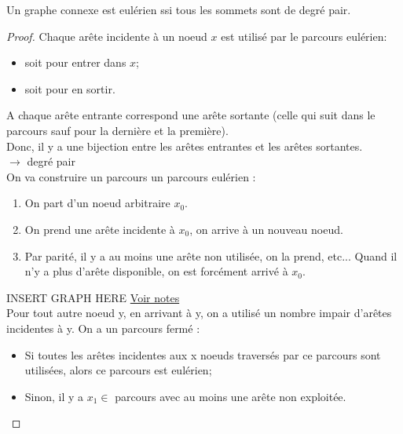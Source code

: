 \begin{mytheo} 
  Un graphe connexe est eulérien ssi tous les sommets sont de degré pair.
  \begin{proof}
    \noindent
    \newline
    \fbox{$\Longrightarrow$}
    \newline
    Chaque arête incidente à un noeud $x$ est utilisé par le parcours eulérien:
    \begin{itemize}
      \item soit pour entrer dans $x$;
      \item soit pour en sortir.\\
    \end{itemize}
    A chaque arête entrante correspond une arête sortante (celle qui suit dans le parcours sauf pour la dernière et la première).\\
    Donc, il y a une bijection entre les arêtes entrantes et les arêtes sortantes.\\
    $\longrightarrow$ degré pair \\

    \noindent
    \fbox{$\Longleftarrow$}
    \newline
    On va construire un parcours un parcours eulérien :\\
    \begin{enumerate}
      \item On part d'un noeud arbitraire $x_0$.
      \item On prend une arête incidente à $x_0$, on arrive à un nouveau noeud.
      \item Par parité, il y a au moins une arête non utilisée, on la prend, etc... Quand il n'y a plus d'arête disponible, on est forcément arrivé à $x_0$.\\
    \end{enumerate}

    INSERT GRAPH HERE \href{https://dl.dropboxusercontent.com/u/44092863/Graph_Theory_Romain_Capron.pdf}{Voir notes} \addTODO\\

    Pour tout autre noeud y, en arrivant à y, on a utilisé un nombre impair d'arêtes incidentes à y. On a un parcours fermé :
    \begin{itemize}
      \item Si toutes les arêtes incidentes aux x noeuds traversés par ce parcours sont utilisées, alors ce parcours est eulérien;
      \item Sinon, il y a $x_1 \in$ parcours avec au moins une arête non exploitée.\\
    \end{itemize}


\end{proof}
\end{mytheo}
